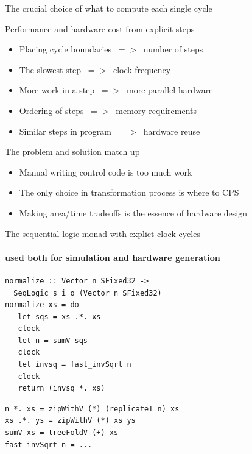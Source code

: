 \documentclass[pdf]{beamer}
\begin{document}
\begin{frame}{The crucial choice of what to compute each single cycle}


\begin{block}{Performance and hardware cost from explicit steps}
\begin{itemize}
\item Placing cycle boundaries $~=>~$ number of steps
\item The slowest step $~=>~$ clock frequency
\item More work in a step $~=>~$ more parallel hardware
\item Ordering of steps $~=>~$  memory requirements
\item Similar steps in program $~=>~$ hardware reuse
\end{itemize}
\end{block}

\begin{block}{The problem and solution match up}
\begin{itemize}
\item Manual writing control code is too much work
\item The only choice in transformation process is where to CPS
\item Making area/time tradeoffs is the essence of hardware design
\end{itemize}
\end{block}


\end{frame}


\begin{frame}[fragile]{The sequential logic monad with explict clock cycles}
\framesubtitle{used both for simulation and hardware generation}
\begin{block}{}
\begin{verbatim}
normalize :: Vector n SFixed32 -> 
  SeqLogic s i o (Vector n SFixed32)
normalize xs = do
   let sqs = xs .*. xs
   clock
   let n = sumV sqs
   clock
   let invsq = fast_invSqrt n
   clock
   return (invsq *. xs)
\end{verbatim}
\end{block}

\begin{block}{}
\begin{verbatim}
n *. xs = zipWithV (*) (replicateI n) xs
xs .*. ys = zipWithV (*) xs ys
sumV xs = treeFoldV (+) xs
fast_invSqrt n = ...
\end{verbatim}
\end{block}

\end{frame}
\end{document}
